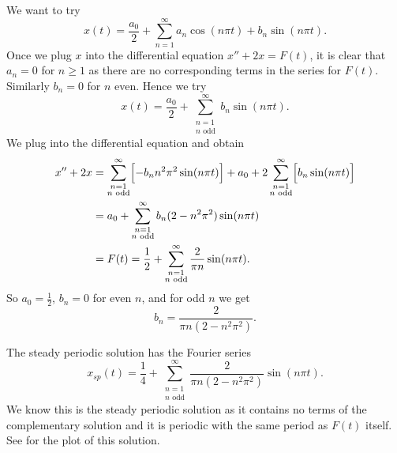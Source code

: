 \begin{example}
We want to try
\begin{equation*}
x(t) = \frac{a_0}{2} + \sum_{n=1}^\infty
a_n \cos (n \pi t) +
b_n \sin (n \pi t) .
\end{equation*}
Once we plug $x$ into the differential equation $x''+2x = F(t)$,
it is clear that $a_n = 0$ for $n \geq 1$ as there are no corresponding terms
in the series for
$F(t)$.  Similarly $b_n = 0$ for $n$ even.  Hence we try
\begin{equation*}
x(t) = \frac{a_0}{2} +
\sum_{\substack{n=1 \\ n \text{ odd}}}^\infty
b_n \sin (n \pi t) .
\end{equation*}
We plug into the differential equation and obtain
\begin{equation*}
\begin{split}
x'' + 2 x & =
\sum_{\substack{n=1 \\ n \text{ odd}}}^\infty
\Bigl[ - b_n n^2 \pi^2 \sin (n \pi t) \Bigr] + 
a_0 +
2
\sum_{\substack{n=1 \\ n \text{ odd}}}^\infty
\Bigl[ b_n \sin (n \pi t) \Bigr]
\\
& =
a_0 +
\sum_{\substack{n=1 \\ n \text{ odd}}}^\infty
b_n (2 - n^2 \pi^2 ) \sin (n \pi t)
\\
& =
F(t) = \frac{1}{2} + \sum_{\substack{n=1 \\ n \text{ odd}}}^\infty
\frac{2}{\pi n} \sin (n \pi t) .
\end{split}
\end{equation*}
So $a_0 = \frac{1}{2}$, $b_n = 0$ for even $n$, and for odd $n$ we
get
\begin{equation*}
b_n = 
\frac{2}{\pi n (2 - n^2 \pi^2 )} .
\end{equation*}

The steady periodic solution has the Fourier series
\begin{equation*}
x_{sp}(t) = \frac{1}{4} + \sum_{\substack{n=1 \\ n \text{ odd}}}^\infty
\frac{2}{\pi n (2 - n^2 \pi^2 )}
\sin (n \pi t) .
\end{equation*}
We know this is the steady periodic solution as it contains no terms 
of the complementary solution and it is periodic with the same period as
$F(t)$ itself.  See  for the plot of this solution.
\begin{myfig}
\capstart
{}
\caption{Plot of the steady periodic solution $x_{sp}$ of
.%
\label{afs:steadyexfig}}
\end{myfig}
\end{example}

